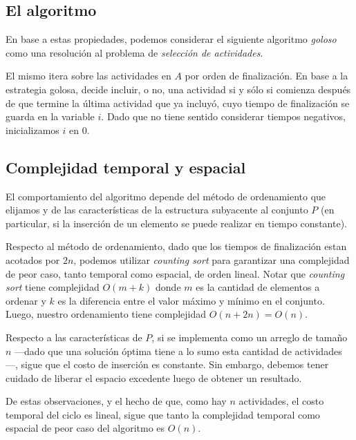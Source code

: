 \subsection{El algoritmo} En base a estas propiedades, podemos considerar el siguiente algoritmo \textit{goloso} como una resolución al problema de \textit{selección de actividades}. 



El mismo itera sobre las actividades en $A$ por orden de finalización. En base a la estrategia golosa, decide incluir, o no, una actividad si y sólo si comienza después de que termine la última actividad que ya incluyó, cuyo tiempo de finalización se guarda en la variable $i$. Dado que no tiene sentido considerar tiempos negativos, inicializamos $i$ en $0$.

\subsection{Complejidad temporal y espacial} El comportamiento del algoritmo depende del método de ordenamiento que elijamos y de las características de la estructura subyacente al conjunto $P$ (en particular, si la inserción de un elemento se puede realizar en tiempo constante). 

Respecto al método de ordenamiento, dado que los tiempos de finalización estan acotados por $2n$, podemos utilizar \textit{counting sort} para garantizar una complejidad de peor caso, tanto temporal como espacial, de orden lineal. Notar que \textit{counting sort} tiene complejidad $O(m + k)$ donde $m$ es la cantidad de elementos a ordenar y $k$ es la diferencia entre el valor máximo y mínimo en el conjunto. Luego, nuestro ordenamiento tiene complejidad $O(n + 2n) = O(n)$.

Respecto a las características de $P$, si se implementa como un arreglo de tamaño $n$ ---dado que una solución óptima tiene a lo sumo esta cantidad de actividades---, sigue que el costo de inserción es constante. Sin embargo, debemos tener cuidado de liberar el espacio excedente luego de obtener un resultado.

De estas observaciones, y el hecho de que, como hay $n$ actividades, el costo temporal del ciclo es lineal, sigue que tanto la complejidad temporal como espacial de peor caso del algoritmo es $O(n)$.